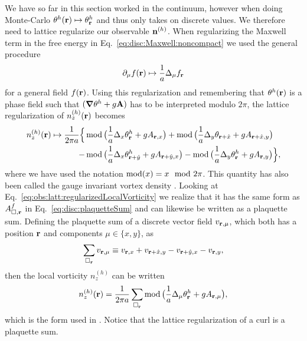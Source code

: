 We have so far in this section worked in the continuum, however when doing Monte-Carlo
$\theta^h({\boldsymbol{\mathbf{r}}}) \mapsto \theta^h_{\boldsymbol{\mathbf{r}}}$ and thus only takes on discrete values. 
We therefore need to lattice regularize our observable ${\boldsymbol{\mathbf{n}}}^{(h)}$. When regularizing
the Maxwell term in the free energy in Eq.~\eqref{eq:disc:Maxwell:noncompact} we used the general
procedure
\begin{equation}
  \partial_\mu f({\boldsymbol{\mathbf{r}}}) \mapsto \frac{1}{a}\Delta_\mu f_{\boldsymbol{\mathbf{r}}}
  \label{eq:obs:latt:gradientRegularization}
\end{equation}
for a general field $f({\boldsymbol{\mathbf{r}}})$.
Using this regularization and remembering that $\theta^h({\boldsymbol{\mathbf{r}}})$ is a phase field such that 
$({\boldsymbol{\mathbf{\nabla}}}\theta^h + g{\boldsymbol{\mathbf{A}}})$ has to be interpreted modulo $2\pi$, the lattice regularization of $n_z^{(h)}({\boldsymbol{\mathbf{r}}})$ becomes
\begin{equation}
  \begin{split}
	n_z^{(h)}({\boldsymbol{\mathbf{r}}}) \mapsto \frac{1}{2\pi a}\Big\{&\operatorname{mod}\big(\frac{1}{a}\Delta_x\theta^h_{\boldsymbol{\mathbf{r}}} + gA_{{\boldsymbol{\mathbf{r}}},x}\big) + \operatorname{mod}\big(\frac{1}{a}\Delta_y\theta_{{\boldsymbol{\mathbf{r}}}+\hat{x}} + gA_{{\boldsymbol{\mathbf{r}}}+\hat{x},y}\big)\\
	-&\operatorname{mod}\big(\frac{1}{a}\Delta_x\theta^h_{{\boldsymbol{\mathbf{r}}}+\hat{y}} + gA_{{\boldsymbol{\mathbf{r}}}+\hat{y},x}\big) - \operatorname{mod}\big(\frac{1}{a}\Delta_y\theta^h_{\boldsymbol{\mathbf{r}}} + gA_{{\boldsymbol{\mathbf{r}}},y}\big)\Big\},
  \end{split}
  \label{eq:obs:latt:regularizedLocalVorticity}
\end{equation}
where we have used the notation $\operatorname{mod}(x) = x\mod2\pi$. This quantity has also been called the gauge invariant vortex density \cite{shimizu12}.
Looking at Eq.~\eqref{eq:obs:latt:regularizedLocalVorticity} we realize that it has the same form as $A^f_{\Box,{\boldsymbol{\mathbf{r}}}}$ in Eq.~\eqref{eq:disc:plaquetteSum}
and can likewise be written as a plaquette sum. Defining the plaquette sum of a discrete vector field $v_{{\boldsymbol{\mathbf{r}}},\mu}$, which both has a position ${\boldsymbol{\mathbf{r}}}$ and components $\mu\in\{x,y\}$, as
\begin{equation}
  \sum_{\Box_{\boldsymbol{\mathbf{r}}}}v_{{\boldsymbol{\mathbf{r}}},\mu} \equiv v_{{\boldsymbol{\mathbf{r}}},x} + v_{{\boldsymbol{\mathbf{r}}}+\hat{x},y} - v_{{\boldsymbol{\mathbf{r}}}+\hat{y},x} - v_{{\boldsymbol{\mathbf{r}}},y},
  \label{eq:obs:latt:plaquetteSum}
\end{equation}
then the local vorticity $n_z^{(h)}$ can be written
\begin{equation}
  n_z^{(h)}({\boldsymbol{\mathbf{r}}}) = \frac{1}{2\pi a}\sum_{\Box_{\boldsymbol{\mathbf{r}}}}\operatorname{mod}\big(\frac{1}{a}\Delta_\mu\theta^h_{\boldsymbol{\mathbf{r}}} + gA_{{\boldsymbol{\mathbf{r}}},\mu}\big),
  \label{eq:obs:latt:shortNotationLocalVorticity}
\end{equation}
which is the form used in \cite{Kragset08}. Notice that the lattice regularization of a curl is a plaquette sum.
